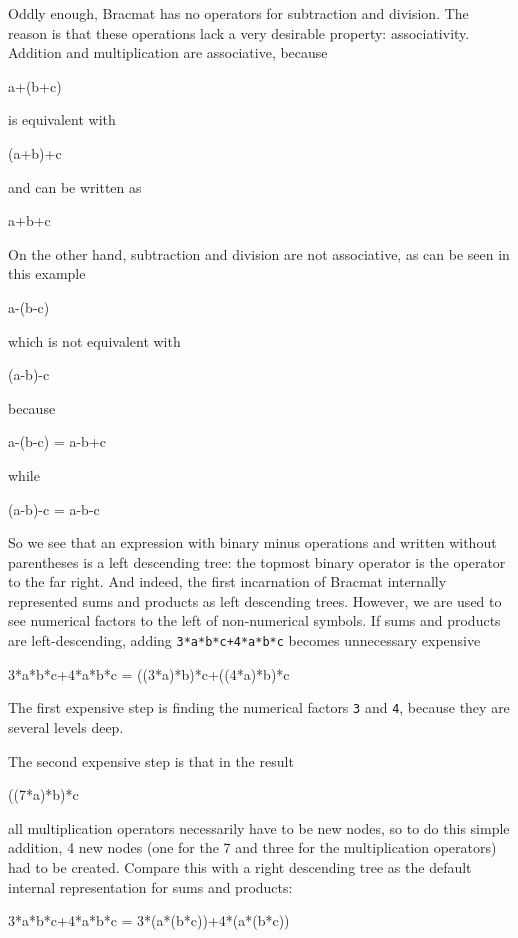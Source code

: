 \documentclass[12pt]{article}
\begin{document}
Oddly enough, Bracmat has no operators for subtraction and
division. The reason is that these operations lack a very desirable
property: associativity. Addition and multiplication are associative,
because
\begin{v}
a+(b+c)
\end{v}
is equivalent with
\begin{v}
(a+b)+c
\end{v}
and can be written as
\begin{v}
a+b+c
\end{v}
On the other hand, subtraction and division are not associative, as
can be seen in this example
\begin{v}
a-(b-c)
\end{v}
which is not equivalent with
\begin{v}
(a-b)-c
\end{v}
because
\begin{v}
a-(b-c) = a-b+c
\end{v}
while
\begin{v}
(a-b)-c = a-b-c
\end{v}

So we see that an expression with binary minus operations and written
without parentheses is a left descending tree: the topmost binary
operator is the operator to the far right. And indeed, the first
incarnation of Bracmat internally represented sums and products as
left descending trees. However, we are used to see numerical factors
to the left of non-numerical symbols. If sums and products are
left-descending, adding \verb|3*a*b*c+4*a*b*c| becomes unnecessary
expensive
\begin{v}
3*a*b*c+4*a*b*c = ((3*a)*b)*c+((4*a)*b)*c
\end{v}

The first expensive step is finding the numerical factors \verb|3| and
\verb|4|, because they are several levels deep.

The second expensive step is that in the result
\begin{v}
((7*a)*b)*c
\end{v}
all multiplication operators necessarily have to be new nodes, so to
do this simple addition, 4 new nodes (one for the 7 and three for the
multiplication operators) had to be created. Compare this with a right
descending tree as the default internal representation for sums and
products:
\begin{v}
3*a*b*c+4*a*b*c = 3*(a*(b*c))+4*(a*(b*c))
\end{v}
\end{document}
